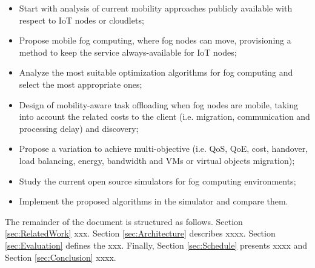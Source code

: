 \begin{itemize}
	\item Start with analysis of current mobility approaches publicly available with respect to IoT nodes or cloudlets;
	\item Propose mobile fog computing, where fog nodes can move, provisioning a method to keep the service always-available for IoT nodes;
	\item Analyze the most suitable optimization algorithms for fog computing and select the most appropriate ones;
	\item Design of mobility-aware task offloading when fog nodes are mobile, taking into account the related costs to the client (i.e. migration, communication and processing delay) and discovery;
	\item Propose a variation to achieve multi-objective (i.e. QoS, QoE, cost, handover, load balancing, energy, bandwidth and VMs or virtual objects migration);
	\item Study the current open source simulators for fog computing environments;
	\item Implement the proposed algorithms in the simulator and compare them.
\end{itemize}

\noindent\tab The remainder of the document is structured as follows. Section \ref{sec:RelatedWork} xxx. Section \ref{sec:Architecture} describes xxxx. Section \ref{sec:Evaluation} defines the xxx. Finally, Section \ref{sec:Schedule} presents xxxx and Section \ref{sec:Conclusion} xxxx.